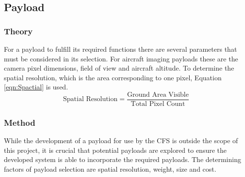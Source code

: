 







\clearpage



\clearpage


\subsection{Payload}
\label{payload}
\subsubsection{Theory} 
For a payload to fulfill its required functions there are several parameters that must be considered in its selection. For aircraft imaging payloads these are the camera pixel dimensions, field of view and aircraft altitude. To determine the spatial resolution, which is the area corresponding to one pixel, Equation \ref{eqn:Spactial} is used.\\
\begin{equation}
    \text{Spatial Resolution} = \frac{\text{Ground Area Visible}}{\text{Total Pixel Count}} \label{eqn:Spactial}
\end{equation}

\subsubsection{Method}
While the development of a payload for use by the CFS is outside the scope of this project, it is crucial that potential payloads are explored to ensure the developed system is able to incorporate the required payloads. The determining factors of payload selection are spatial resolution, weight, size and cost. 

